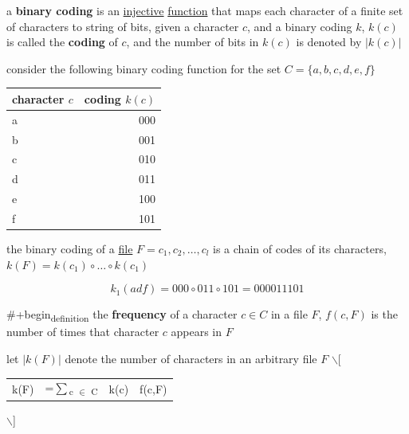 \documentclass[a4paper,12pt]{article}
\begin{document}
\newenvironment{note}
  {\begin{bclogo}[logo=\bcinfo, couleurBarre=orange, couleur=lightgray]{ note}}
  {\end{bclogo}}
\newenvironment{attention}
  {\begin{bclogo}[logo=\bcattention, couleurBarre=red, noborder=true, 
                couleur=red!15]{Important!}}
  {\end{bclogo}}

\begin{definition}
a \textbf{binary coding} is an \href{discrete_maths2.org}{injective} \href{discrete_maths2.org}{function} that maps each character of a finite set of characters to string of bits, given a character \(c\), and a binary coding \(k\), \(k(c)\) is called the \textbf{coding} of \(c\), and the number of bits in \(k(c)\) is denoted by \(|k(c)|\)
\begin{my_example}
consider the following binary coding function for the set \(C=\{a,b,c,d,e,f\}\)
\begin{center}
\begin{tabular}{lr}
character \(c\) & coding \(k(c)\)\\[0pt]
\hline
a & 000\\[0pt]
b & 001\\[0pt]
c & 010\\[0pt]
d & 011\\[0pt]
e & 100\\[0pt]
f & 101\\[0pt]
\end{tabular}
\end{center}
\end{my_example}
\end{definition}
\begin{definition}
the binary coding of a \href{20230119162026-file.org}{file} \(F=c_1,c_2,\dots,c_l\) is a chain of codes of its characters, \(k(F)=k(c_1)\circ\dots\circ k(c_1)\)
\begin{my_example}
\[
k_1(adf) = 000 \circ 011 \circ 101 = 000011101
\]
\end{my_example}
\end{definition}
\#+begin\textsubscript{definition}
the \textbf{frequency} of a character \(c \in C\) in a file \(F\), \(f(c,F)\) is the number of times that character \(c\) appears in \(F\)
\begin{characteristic}
let \(|k(F)|\) denote the number of characters in an arbitrary file \(F\)
$\backslash$[
\begin{center}
\begin{tabular}{llll}
k(F) & =\(\sum\)\textsubscript{c \(\in\) C} & k(c) & f(c,F)\\[0pt]
\end{tabular}
\end{center}
$\backslash$]
\end{characteristic}
\end{document}
